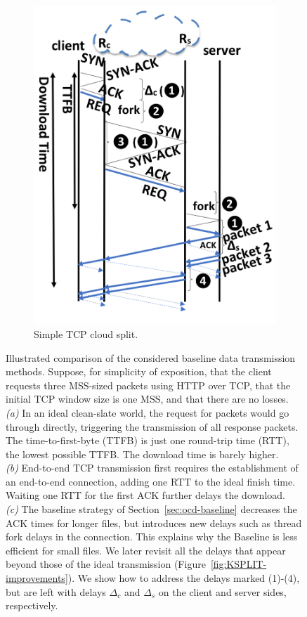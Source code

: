 \documentclass[newfonts=false,format=sigconf,10pt,letterpaper]{acmart}
\begin{document}
\begin{figure}[!t]
\begin{subfigure}{0.65\columnwidth}
  \includegraphics[width=\columnwidth,clip]{figures/split.png}
    \caption{Simple TCP cloud split.} \label{fig:baseline}
\end{subfigure}
    \caption{Illustrated comparison of the considered baseline data transmission methods. Suppose, for simplicity of exposition, that the client requests three MSS-sized packets using HTTP over TCP, that the initial TCP window size is one MSS, and that there are no losses.\\ \textit{(a)} In an ideal clean-slate world, the request for packets would go through directly, triggering the transmission of all response packets. The time-to-first-byte (TTFB) is just one round-trip time (RTT), the lowest possible TTFB. The download time is barely higher.\\ \textit{(b)} End-to-end TCP transmission first requires the establishment of an end-to-end connection, adding one RTT to the ideal finish time. Waiting one RTT for the first ACK further delays the download. \\ \textit{(c)} The baseline strategy of Section~\ref{sec:ocd-baseline} decreases the ACK times for longer files, but introduces new delays such as thread fork delays in the connection. This explains why the Baseline is less efficient for small files. We later revisit all the delays that appear beyond those of the ideal transmission (Figure~\ref{fig:KSPLIT-improvements}). We show how to address the delays marked (1)-(4), but are left with delays $\Delta_c$ and $\Delta_s$ on the client and server sides, respectively.  }
\end{figure}
\end{document}
